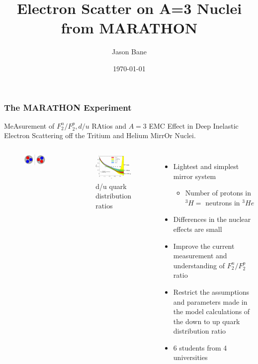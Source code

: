 \documentclass{beamer}
\title[MARATHON A=3]{Electron Scatter on A=3 Nuclei from MARATHON } %
\author{Jason Bane} %
\institute[UTK] %
{
	University of Tennessee \\ %
	\medskip
	\textit{jbane1@vols.utk.edu} %
}
\date{\today} %
\begin{document}
\begin{frame}
\titlepage %
\end{frame}


\begin{frame}
\frametitle{The MARATHON Experiment}
MeAsurement of $F^n_2/F^p_2, d/u$ RAtios and $A=3$ EMC Effect in Deep Inelastic Electron Scattering off the Tritium and Helium MirrOr Nuclei.
\vspace{-10pt}
\begin{columns}[t]
	
	
	\begin{figure}
		\includegraphics[width =5cm]{../images/mirror}
	\end{figure}
	\vspace{-25pt}
	\begin{figure}
		\includegraphics[width=5cm]{../images/d_u}
		\caption{d/u quark distribution ratios}
	\end{figure}
	
	\begin{itemize}
		\item Lightest and simplest mirror system
		\begin{itemize}
			\item  Number of protons in $^3H =$ neutrons in $^3He$
		\end{itemize}
		\item Differences in the nuclear effects are small
		\item Improve the current measurement and understanding of $F^n_2/F^p_2$ ratio
		\item Restrict the assumptions and parameters made in the model calculations of the down to up quark distribution ratio
		\item 6 students from 4 universities
	\end{itemize}
	

\end{columns}
\end{frame}
\end{document}
